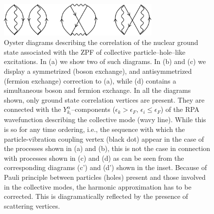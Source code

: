 \begin{figure}
\centerline {
\includegraphics*[width=8cm]{introduccion/figs/figintroA1}
}
\caption{Oyster diagrams describing the correlation of the nuclear ground state associated with the ZPF of  collective particle--hole--like excitations. In (a) we show two of such diagrams. In (b) and (c) we display a symmetrized (boson exchange), and antisymmetrized  (fermion exchange) correction to (a), while  (d) contains a simultaneous boson and fermion exchange. In all the diagrams shown, only ground state correlation vertices are present. They are connected with the $Y^\alpha_{k_i}$--components ($\epsilon_k>\epsilon_F, \,\epsilon_i\le\epsilon_F$) of the RPA wavefunction describing the collective mode (wavy line). While this is so for any time ordering, i.e., the sequence with which the particle-vibration coupling vertex (black dot) appear in the case of the processes shown in (a) and (b), this is not the case in connection with processes shown in (c) and (d) as can be seen from the corresponding diagrams (c') and (d') shown in the inset. Because of Pauli principle between particles (holes) present and those involved in the collective modes, the harmonic approximation has to be corrected. This is diagramatically reflected by the presence of scattering vertices.}
\label{figintroA1}
\end{figure}
